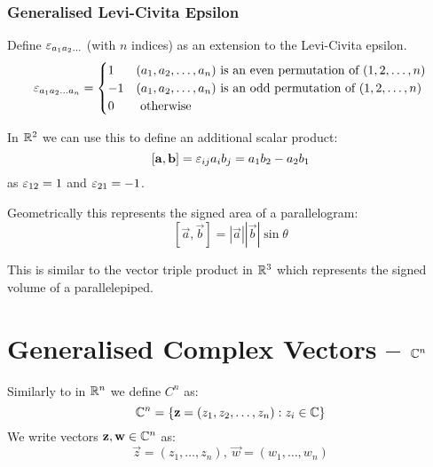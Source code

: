\documentclass[../main.tex]{subfiles}
\begin{document}
\subsubsection{Generalised Levi-Civita Epsilon}
Define $\varepsilon_{a_1 a_2 \ldots}$ (with $n$ indices) as an extension to the Levi-Civita epsilon.
\[
  \varepsilon_{a_1 a_2 \ldots a_n} = \begin{cases}
  1 & (a_1, a_2, \ldots, a_n) \text{ is an even permutation of }(1, 2, \ldots, n) \\
  -1 & (a_1, a_2, \ldots, a_n) \text{ is an odd permutation of }(1, 2, \ldots, n) \\
  0 & \text{ otherwise}
  \end{cases}
\]
\begin{remark}[Note]
  In $\mathbb{R}^{2}$ we can use this to define an additional scalar product:
  \[
    [\boldsymbol{\mathbf{a}}, \boldsymbol{\mathbf{b}}] = \varepsilon_{i j}a_i b_j = a_1 b_2 - a_2 b_1
  \]
  as $\varepsilon_{1 2} = 1$ and $\varepsilon_{2 1} = -1$.

  Geometrically this represents the signed area of a parallelogram:
  \[
    [\vec{a}, \vec{b}] = |\vec{a}||\vec{b}|\sin\theta
  \]
  \begin{center}
  \end{center}
  This is similar to the vector triple product in  $\mathbb{R}^{3}$ which represents the signed volume of a parallelepiped.
\end{remark}
\section{Generalised Complex Vectors\texorpdfstring{ -- $\mathbb{C}^{n}$}{}}
Similarly to in $\mathbb{R}^{n}$ we define $C^{n}$ as:
\[
  \mathbb{C}^{n} = \{\boldsymbol{\mathbf{z}} = (z_1, z_2, \ldots, z_n): z_i \in \mathbb{C}\}
\]
We write vectors $\boldsymbol{\mathbf{z}}, \boldsymbol{\mathbf{w}} \in \mathbb{C}^{n}$ as:
\[
  \vec{z} = (z_1, \ldots, z_n),\ \vec{w} = (w_1, \ldots, w_n)
\]
\end{document}
